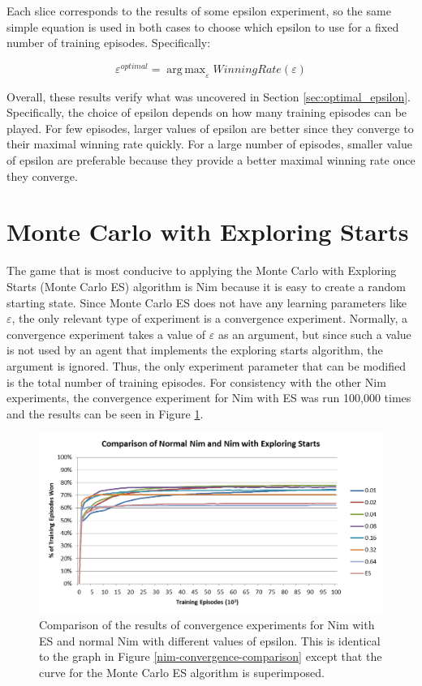 \documentclass[11pt,a4paper]{report}
\newcommand{\argmax}{\mathop{\mathrm{arg\,max}}}
\begin{document}
Each slice corresponds to the results of some epsilon experiment, so the same simple equation is used  in both cases to choose which epsilon to use for a fixed number of training episodes. Specifically:

\begin{equation}
	\varepsilon^{optimal} = \argmax_{\varepsilon} WinningRate(\varepsilon)
\end{equation}

Overall, these results verify what was uncovered in Section \ref{sec:optimal_epsilon}. Specifically, the choice of epsilon depends on how many training episodes can be played. For few episodes, larger values of epsilon are better since they converge to their maximal winning rate quickly. For a large number of episodes, smaller value of epsilon are preferable because they provide a better maximal winning rate once they converge.


\section{Monte Carlo with Exploring Starts}

The game that is most conducive to applying the Monte Carlo with Exploring Starts (Monte Carlo ES) algorithm is Nim because it is easy to create a random starting state. Since Monte Carlo ES does not have any learning parameters like $\varepsilon$, the only relevant type of experiment is a convergence experiment. Normally, a convergence experiment takes a value of $\varepsilon$ as an argument, but since such a value is not used by an agent that implements the exploring starts algorithm, the argument is ignored. Thus, the only experiment parameter that can be modified is the total number of training episodes. For consistency with the other Nim experiments, the convergence experiment for Nim with ES was run 100,000 times and the results can be seen in Figure \ref{nim-convergence-comparison-with-ES}.

\begin{figure}[htbp]
	\begin{center}
		\includegraphics[width=\linewidth]{Nim_PerformanceResults_Comparison_001_to_064_and_ES.png}
		\caption{Comparison of the results of convergence experiments for Nim with ES and normal Nim with different values of epsilon. This is identical to the graph in Figure \ref{nim-convergence-comparison} except that the curve for the Monte Carlo ES algorithm is superimposed.}
		\label{nim-convergence-comparison-with-ES}
	\end{center}
\end{figure}
\end{document}
